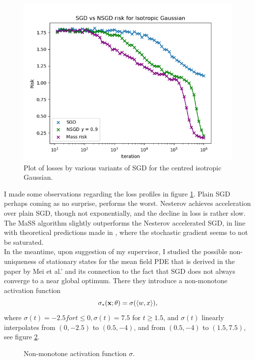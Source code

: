 \documentclass{article}
\begin{document}
\begin{figure}[H]
    \centering
    \includegraphics[width=0.6\linewidth]{images/Nguyen2018-SGD-algos-risk-iso-gauss.png}
    \caption{Plot of losses by various variants of SGD for the centred isotropic Gaussian.}
    \label{fig: SGD iso gauss losses}
\end{figure}

I made some observations regarding the loss profiles in figure \ref{fig: SGD iso gauss losses}. Plain SGD perhaps coming as no surprise, performs the worst. Nesterov achieves acceleration over plain SGD, though not exponentially, and the decline in loss is rather slow. The MaSS algorithm slightly outperforms the Nesterov accelerated SGD, in line with theoretical predictions made in \cite{liu2019acceleratingsgdmomentumoverparameterized}, where the stochastic gradient seems to not be saturated.\\

In the meantime, upon suggestion of my supervisor, I studied the possible non-uniqueness of stationary states for the mean field PDE that is derived in the paper by Mei et al.’ and its connection to the fact that SGD does not always converge to a near global optimum. There they introduce a non-monotone activation function
\begin{equation}
	\sigma_*( \mathbf{x}; \mathbf{\theta})= \sigma(\langle w, x\rangle), 
\end{equation}
where $\sigma(t) = −2.5 for t \leq 0, σ(t) = 7.5$ for $t \geq 1.5$, and $\sigma(t)$ linearly
interpolates from $(0, −2.5)$ to $(0.5, −4)$, and from $(0.5, −4)$ to $(1.5, 7.5)$, see figure \ref{fig: non-monotone activation fn}.

\begin{figure}[H]
    \centering
    
    \caption{Non-monotone activation function $\sigma$.}
    \label{fig: non-monotone activation fn}
\end{figure}
\end{document}
